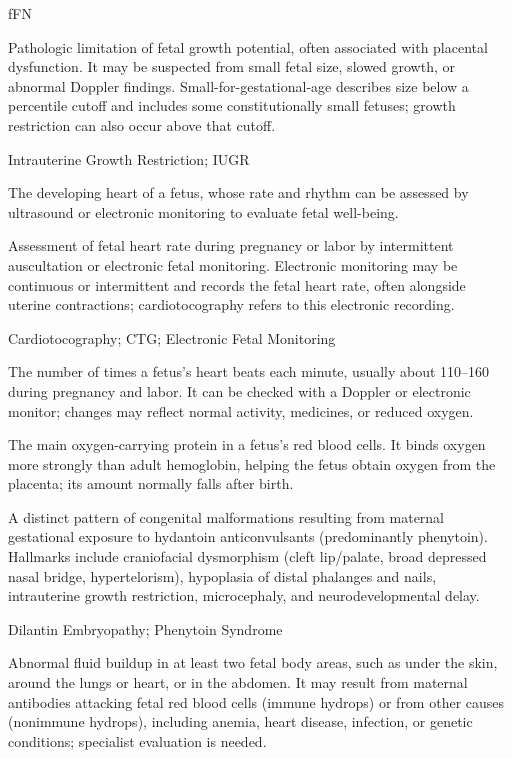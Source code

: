 \synonyms
fFN

 Pathologic limitation of fetal growth potential, often associated with placental dysfunction. It may be suspected from small fetal size, slowed growth, or abnormal Doppler findings. Small-for-gestational-age describes size below a percentile cutoff and includes some constitutionally small fetuses; growth restriction can also occur above that cutoff.

\synonyms
Intrauterine Growth Restriction; IUGR

 The developing heart of a fetus, whose rate and rhythm can be assessed by ultrasound or electronic monitoring to evaluate fetal well-being.

 Assessment of fetal heart rate during pregnancy or labor by intermittent auscultation or electronic fetal monitoring. Electronic monitoring may be continuous or intermittent and records the fetal heart rate, often alongside uterine contractions; cardiotocography refers to this electronic recording.

\synonyms
Cardiotocography; CTG; Electronic Fetal Monitoring

 The number of times a fetus’s heart beats each minute, usually about 110–160 during pregnancy and labor. It can be checked with a Doppler or electronic monitor; changes may reflect normal activity, medicines, or reduced oxygen.

 The main oxygen-carrying protein in a fetus’s red blood cells. It binds oxygen more strongly than adult hemoglobin, helping the fetus obtain oxygen from the placenta; its amount normally falls after birth.

 A distinct pattern of congenital malformations resulting from maternal gestational exposure to hydantoin anticonvulsants (predominantly phenytoin). Hallmarks include craniofacial dysmorphism (cleft lip/palate, broad depressed nasal bridge, hypertelorism), hypoplasia of distal phalanges and nails, intrauterine growth restriction, microcephaly, and neurodevelopmental delay.

\synonyms
Dilantin Embryopathy; Phenytoin Syndrome

 Abnormal fluid buildup in at least two fetal body areas, such as under the skin, around the lungs or heart, or in the abdomen. It may result from maternal antibodies attacking fetal red blood cells (immune hydrops) or from other causes (nonimmune hydrops), including anemia, heart disease, infection, or genetic conditions; specialist evaluation is needed.

